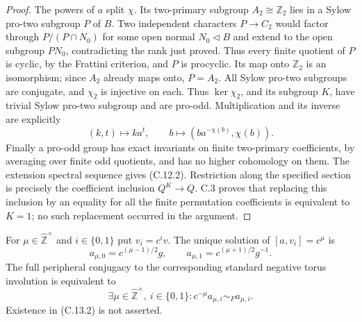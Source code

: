\begin{proof}
The powers of $a$ split $\chi$.  Its two-primary
subgroup $A_2\cong\mathbb Z_2$ lies in a Sylow
pro-two subgroup $P$ of $B$.  Two independent
characters $P\to C_2$ would factor through
$P/(P\cap N_0)$ for some open normal
$N_0\lhd B$ and extend to the open subgroup
$PN_0$, contradicting the rank just proved.
Thus every finite quotient of $P$ is cyclic,
by the Frattini criterion, and $P$ is procyclic.
Its map onto $\mathbb Z_2$ is an isomorphism;
since $A_2$ already maps onto, $P=A_2$.
All Sylow pro-two subgroups are conjugate,
and $\chi_2$ is injective on each.  Thus
$\ker\chi_2$, and its subgroup $K$, have
trivial Sylow pro-two subgroup and are
pro-odd.  Multiplication and its inverse
are explicitly
\[
 (k,t)\mapsto ka^t,\qquad
 b\mapsto(ba^{-\chi(b)},\chi(b)).
\]
Finally a pro-odd group has exact invariants
on finite two-primary coefficients, by
averaging over finite odd quotients, and
has no higher cohomology on them.  The
extension spectral sequence gives (C.12.2).
Restriction along the specified section
is precisely the coefficient inclusion
$Q^K\to Q$.  C.3 proves that replacing this
inclusion by an equality for all the
finite permutation coefficients is
equivalent to $K=1$; no such replacement
occurred in the argument.
\end{proof}

For $\mu\in\widehat{\mathbb Z}^{\times}$ and
$i\in\{0,1\}$ put $v_i=c^iv$.  The unique solution
of $[a,v_i]=c^\mu$ is
\[
 a_{\mu,0}=c^{(\mu-1)/2}g,
 \qquad a_{\mu,1}=c^{(\mu+1)/2}g^{-1}.                        \tag{C.13.1}
\]
The full peripheral conjugacy to the corresponding
standard negative torus involution is equivalent to
\[
 \exists\mu\in\widehat{\mathbb Z}^{\times},\ i\in\{0,1\}:
                 c^{-\mu}a_{\mu,i}\sim_F a_{\mu,i}.           \tag{C.13.2}
\]
Existence in (C.13.2) is not asserted.

